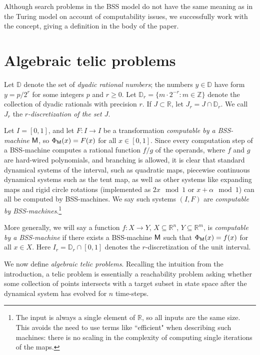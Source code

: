 \documentclass{amsart}
\theoremstyle{theorem}
\theoremstyle{remark}
\newcommand{\DD}{\mathbb{D}}
\newcommand{\RR}{\mathbb{R}}
\newcommand{\ZZ}{\mathbb{Z}}
\newcommand{\ccM}{\textsf{\upshape M}}
\begin{document}
Although search problems in the BSS model do not have the same meaning as in the Turing model on account of computability issues, we successfully work with the concept, giving a definition in the body of the paper.



\section{Algebraic telic problems}\label{secRealTelic}

Let $\DD$ denote the set of \emph{dyadic rational numbers}; the numbers $y \in \DD$ have form $y = p/2^r$ for some integers $p$ and $r \geq 0$.
Let $\DD_r = \{m \cdot 2^{-r} : m \in \ZZ\}$ denote the collection of dyadic rationals with precision $r$.
If $J \subset \RR$, let $J_r = J \cap \DD_r$. We call $J_r$ the \emph{$r$-discretization of the set $J$}.

Let $I = [0,1]$, and let $F:I\rightarrow I$ be a transformation \emph{computable by a BSS-machine} $\ccM$, so $\Phi_\ccM(x) = F(x)$ for all $x \in [0,1]$.
Since every computation step of a BSS-machine computes a rational function $f/g$ of the operands, where $f$ and $g$ are hard-wired polynomials, and branching is allowed, it is clear that standard dynamical systems of the interval, such as quadratic maps, piecewise continuous dynamical systems such as the tent map, as well as other systems like expanding maps and rigid circle rotations (implemented as $2x \mod 1$ or $x+\alpha \mod 1$) can all be computed by BSS-machines.
We say such systems $(I, F)$ are \emph{computable by BSS-machines}.\footnote{The input is always a single element of $\RR$, so all inputs are the same size. This avoids the need to use terms like ``efficient" when describing such machines: there is no scaling in the complexity of computing single iterations of the maps.}

More generally, we will say a function $f:X\rightarrow Y$, $X \subseteq \RR^n$, $Y \subseteq \RR^m$, is \emph{computable by a BSS-machine} if there exists a BSS-machine $\ccM$ such that $\Phi_\ccM(x) = f(x)$ for all $x \in X$.
Here $I_r = \DD_r \cap [0,1]$ denotes the $r$-discretization of the unit interval.

We now define \emph{algebraic telic problems}. Recalling the intuition from the introduction, a telic problem is essentially a reachability problem asking whether some collection of points intersects with a target subset in state space after the dynamical system has evolved for $n$ time-steps.
\end{document}
